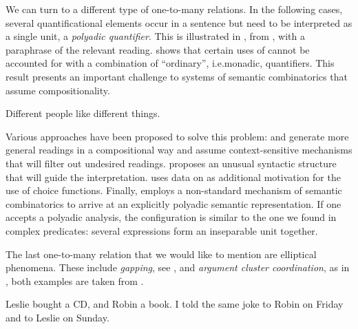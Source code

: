 \documentclass[output=paper]{langscibook}
\begin{document}
\medskip%
We can turn to a different type of one-to-many relations.
In the following cases, several quantificational elements occur in a
sentence but need to be interpreted as a single unit, a \emph{polyadic
  quantifier}. This is illustrated in , from \citet{Keenan:92},
with a paraphrase of the relevant reading.
 \citet{Keenan:92} shows that certain uses of  cannot be accounted for with a combination of ``ordinary'', i.e.\@ monadic, quantifiers. 
This result presents an important challenge 
to systems of semantic combinatorics that assume compositionality.
%


\begin{exe}
  \ex
  \label{ex-different}
  Different people like different things.\\
\end{exe}


\begin{sloppypar}
  Various approaches have been proposed to solve this problem:
  \citet{Moltmann:95} and \citet{Beck:06} generate more general
  readings in a compositional way and assume context-sensitive
  mechanisms that will filter out undesired readings.
  \citet{Barker:07} proposes an unusual syntactic structure that will
  guide the interpretation.  \citet{Lahm:2016} uses data on
   as additional motivation for the use of choice
  functions.  Finally, \citet{Richter:16} employs a non-standard
  mechanism of semantic combinatorics to arrive at an explicitly
  polyadic semantic representation.  If one accepts a polyadic
  analysis, the configuration is similar to the one we found in
  complex predicates: several expressions form an inseparable unit
  together.
\end{sloppypar}

\medskip%
The last one-to-many relation that we would like to mention are elliptical phenomena. 
These include \emph{gapping}, see , and \emph{argument cluster coordination}, as in , both examples are taken from \citet{Kubota:Levine:16-Gapping}.

\ea \label{ex-gap-acc}
\begin{xlist}
\ex
\label{ex-gapping}
Leslie bought a CD, and Robin a book.
%
\ex \label{ex-acc}
I told the same joke to Robin on Friday and to Leslie on Sunday. \citep{Kubota:Levine:16-Gapping}
\end{xlist}
\z 
\end{document}
